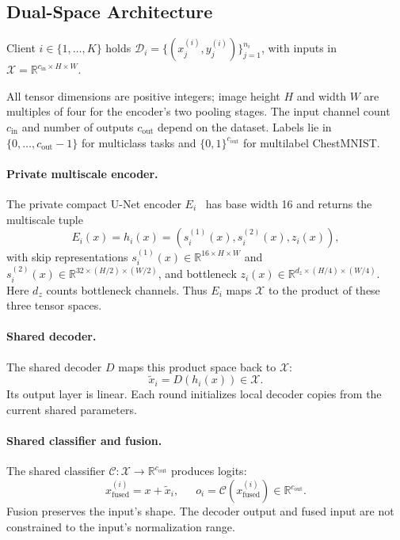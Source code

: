 \documentclass[twoside]{article}
\newif\ifcoauthorreview
\newcommand{\coauthordiffcolor}{\ifcoauthorreview\color[RGB]{0,70,140}\else\color[RGB]{0,0,0}\fi}
\newenvironment{coauthorchange}{\par\begingroup\coauthordiffcolor}{\par\endgroup}
\theoremstyle{thmstyleone}%
\theoremstyle{thmstyletwo}%
\theoremstyle{thmstylethree}%
\begin{document}
\begin{coauthorchange}
\subsection{Dual-Space Architecture}

Client $i\in\{1,\ldots,K\}$ holds
$\mathcal{D}_i=\{(x_j^{(i)},y_j^{(i)})\}_{j=1}^{n_i}$, with inputs in
$\mathcal{X}=\mathbb{R}^{c_{\mathrm{in}}\times H\times W}$.

All tensor dimensions are positive integers; image height $H$ and width $W$
are multiples of four for the encoder's two pooling stages.
The input channel count $c_{\mathrm{in}}$ and
number of outputs $c_{\mathrm{out}}$ depend on the dataset.
Labels lie in $\{0,\ldots,c_{\mathrm{out}}-1\}$ for multiclass tasks and
$\{0,1\}^{c_{\mathrm{out}}}$ for multilabel ChestMNIST.

\paragraph{Private multiscale encoder.}
The private compact U-Net encoder $E_i$~\cite{ronneberger2015unet} has base
width 16 and returns the multiscale tuple
\begin{equation*}
E_i(x)
=
h_i(x)
=
\left(s_i^{(1)}(x),s_i^{(2)}(x),z_i(x)\right),
\end{equation*}
with skip representations
$s_i^{(1)}(x)\in\mathbb{R}^{16\times H\times W}$ and
$s_i^{(2)}(x)\in\mathbb{R}^{32\times(H/2)\times(W/2)}$, and bottleneck
$z_i(x)\in\mathbb{R}^{d_z\times(H/4)\times(W/4)}$.
Here $d_z$ counts bottleneck channels. Thus $E_i$ maps $\mathcal{X}$ to the
product of these three tensor spaces.

\paragraph{Shared decoder.}
The shared decoder $D$ maps this product space back to $\mathcal{X}$:
\begin{equation*}
\tilde{x}_i
=
D\!\left(h_i(x)\right)\in\mathcal{X}.
\end{equation*}
Its output layer is linear. Each round initializes local decoder copies
from the current shared parameters.

\paragraph{Shared classifier and fusion.}
The shared classifier
$\mathcal{C}:\mathcal{X}\to\mathbb{R}^{c_{\mathrm{out}}}$ produces logits:
\begin{equation*}
x_{\mathrm{fused}}^{(i)}
=
x+\tilde{x}_i, \,\,\,\,\,\,\,\,\,
o_i
=
\mathcal{C}\!\left(x_{\mathrm{fused}}^{(i)}\right)
\in\mathbb{R}^{c_{\mathrm{out}}}.
\end{equation*}
Fusion preserves the input's shape. The decoder output and fused input
are not constrained to the input's normalization range.
\end{coauthorchange}
\end{document}
